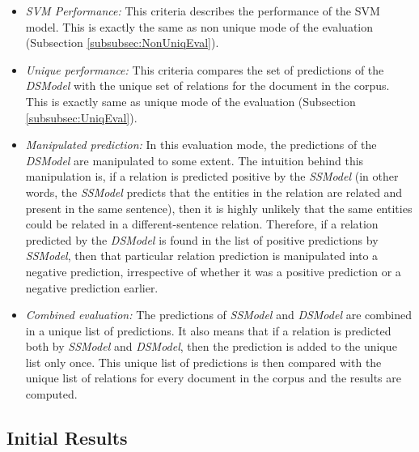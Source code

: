 \begin{itemize}

\item \textit{SVM Performance:} This criteria describes the performance of the SVM model. This is exactly the same as non unique mode of the evaluation (Subsection \ref{subsubsec:NonUniqEval}).

\item \textit{Unique performance:} This criteria compares the set of predictions of the \textit{DSModel} with the unique set of relations for the document in the corpus. This is exactly same as unique mode of the evaluation (Subsection \ref{subsubsec:UniqEval}).

\item \textit{Manipulated prediction:} In this evaluation mode, the predictions of the \textit{DSModel} are manipulated to some extent. The intuition behind this manipulation is, if a relation is predicted positive by the \textit{SSModel} (in other words, the \textit{SSModel} predicts that the entities in the relation are related and present in the same sentence), then it is highly unlikely that the same entities could be related in a different-sentence relation. Therefore, if a relation predicted by the \textit{DSModel} is found in the list of positive predictions by \textit{SSModel}, then that particular relation prediction is manipulated into a negative prediction, irrespective of whether it was a positive prediction or a negative prediction earlier.

\item \textit{Combined evaluation:} The predictions of \textit{SSModel} and \textit{DSModel} are combined in a unique list of predictions. It also means that if a relation is predicted both by \textit{SSModel} and \textit{DSModel}, then the prediction is added to the unique list only once. This unique list of predictions is then compared with the unique list of relations for every document in the corpus and the results are computed.

\end{itemize}

\subsection{Initial Results}

